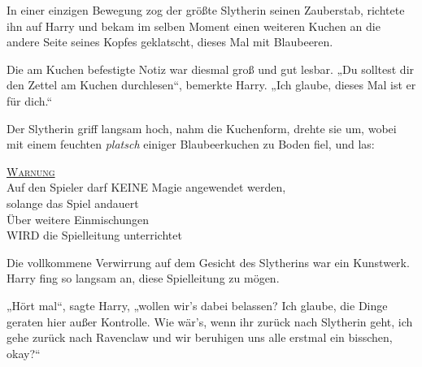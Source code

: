 In einer einzigen Bewegung zog der größte Slytherin seinen Zauberstab, richtete ihn auf Harry und bekam im selben Moment einen weiteren Kuchen an die andere Seite seines Kopfes geklatscht, dieses Mal mit Blaubeeren.

Die am Kuchen befestigte Notiz war diesmal groß und gut lesbar. „Du solltest dir den Zettel am Kuchen durchlesen“, bemerkte Harry. „Ich glaube, dieses Mal ist er für dich.“

Der Slytherin griff langsam hoch, nahm die Kuchenform, drehte sie um, wobei mit einem feuchten \emph{platsch} einiger Blaubeerkuchen zu Boden fiel, und las:
\begin{writtenNote}\centering
\textsc{\underline{Warnung}}\\
Auf den Spieler darf \MakeUppercase{keine} Magie angewendet werden,\\
solange das Spiel andauert\\
Über weitere Einmischungen\\
\MakeUppercase{wird} die Spielleitung unterrichtet
\end{writtenNote}

Die vollkommene Verwirrung auf dem Gesicht des Slytherins war ein Kunstwerk. Harry fing so langsam an, diese Spielleitung zu mögen.

„Hört mal“, sagte Harry, „wollen wir’s dabei belassen? Ich glaube, die Dinge geraten hier außer Kontrolle. Wie wär’s, wenn ihr zurück nach Slytherin geht, ich gehe zurück nach Ravenclaw und wir beruhigen uns alle erstmal ein bisschen, okay?“

